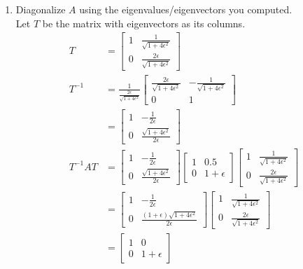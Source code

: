 \documentclass[letter, 11pt]{article}
\begin{document}
\begin{enumerate}[wide = 0pt, label = \textbf{Problem \arabic*:}]
\begin{enumerate}
			\item {Diagonalize $ A $ using the eigenvalues/eigenvectors you computed.} \\
			Let $ T $ be the matrix with eigenvectors as its columns.
			\begin{align*}
				T &= 
				\begin{bmatrix}
				1 & \frac{1}{\sqrt{1 + 4 \epsilon^2}} \\
				0 & \frac{2 \epsilon}{\sqrt{1 + 4 \epsilon^2}}
				\end{bmatrix}
				\\
				T^{-1} &= \frac{1}{\frac{2 \epsilon}{\sqrt{1 + 4 \epsilon^2}}} 
				\begin{bmatrix}
				\frac{2 \epsilon}{\sqrt{1 + 4 \epsilon^2}} & -\frac{1}{\sqrt{1 + 4 \epsilon^2}} \\
				0 & 1
				\end{bmatrix}
				\\
				&=
				\begin{bmatrix}
				1 & -\frac{1}{2 \epsilon} \\
				0 & \frac{\sqrt{1 + 4 \epsilon^2}}{2 \epsilon}
				\end{bmatrix}
				\\
				T^{-1}AT &= 
				\begin{bmatrix}
				1 & -\frac{1}{2 \epsilon} \\
				0 & \frac{\sqrt{1 + 4 \epsilon^2}}{2 \epsilon}
				\end{bmatrix}
				\begin{bmatrix}
				1 & 0.5 \\
				0 & 1 + \epsilon
				\end{bmatrix}
				\begin{bmatrix}
				1 & \frac{1}{\sqrt{1 + 4 \epsilon^2}} \\
				0 & \frac{2 \epsilon}{\sqrt{1 + 4 \epsilon^2}}
				\end{bmatrix}
				\\
				&=
				\begin{bmatrix}
				1 & -\frac{1}{2 \epsilon}\\
				0 & \frac{(1 + \epsilon)\sqrt{1 + 4 \epsilon^2}}{2 \epsilon}
				\end{bmatrix}
				\begin{bmatrix}
				1 & \frac{1}{\sqrt{1 + 4 \epsilon^2}} \\
				0 & \frac{2 \epsilon}{\sqrt{1 + 4 \epsilon^2}}
				\end{bmatrix}
				\\
				&=
				\begin{bmatrix}
				1 & 0 \\
				0 & 1 + \epsilon
				\end{bmatrix}
			\end{align*} \\
			

\end{enumerate}
\end{enumerate}
\end{document}
